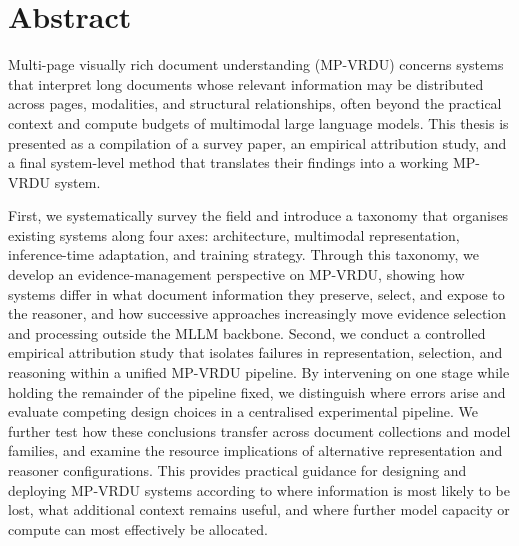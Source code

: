 \documentclass[11pt,twoside,openany]{report}
\begin{document}


\pagestyle{plain}

\section*{Abstract}

Multi-page visually rich document understanding (MP-VRDU) concerns systems that interpret long documents whose relevant information may be distributed across pages, modalities, and structural relationships, often beyond the practical context and compute budgets of multimodal large language models. This thesis is presented as a compilation of a survey paper, an empirical attribution study, and a final system-level method that translates their findings into a working MP-VRDU system.

First, we systematically survey the field and introduce a taxonomy that organises existing systems along four axes: architecture, multimodal representation, inference-time adaptation, and training strategy. Through this taxonomy, we develop an evidence-management perspective on MP-VRDU, showing how systems differ in what document information they preserve, select, and expose to the reasoner, and how successive approaches increasingly move evidence selection and processing outside the MLLM backbone. Second, we conduct a controlled empirical attribution study that isolates failures in representation, selection, and reasoning within a unified MP-VRDU pipeline. By intervening on one stage while holding the remainder of the pipeline fixed, we distinguish where errors arise and evaluate competing design choices in a centralised experimental pipeline. We further test how these conclusions transfer across document collections and model families, and examine the resource implications of alternative representation and reasoner configurations. This provides practical guidance for designing and deploying MP-VRDU systems according to where information is most likely to be lost, what additional context remains useful, and where further model capacity or compute can most effectively be allocated.
\end{document}
